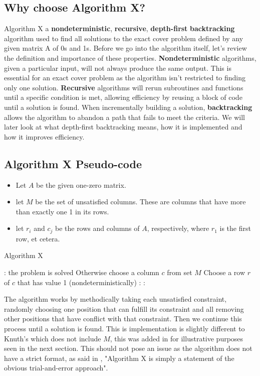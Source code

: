 \documentclass{article}
\begin{document}
\subsection{Why choose Algorithm X?}
Algorithm X a \textbf{nondeterministic}, \textbf{recursive}, \textbf{depth-first} \textbf{backtracking} algorithm used to find all solutions to the exact cover problem defined by any given matrix A of 0s and 1s. Before we go into the algorithm itself, let's review the definition and importance of these properties. \textbf{Nondeterministic} algorithms, given a particular input, will not always produce the same output. This is essential for an exact cover problem as the algorithm isn't restricted to finding only one solution. \textbf{Recursive} algorithms will rerun subroutines and functions until a specific condition is met, allowing efficiency by reusing a block of code until a solution is found. When incrementally building a solution, \textbf{backtracking} allows the algorithm to abandon a path that fails to meet the criteria. We will later look at what depth-first backtracking means, how it is implemented and how it improves efficiency.
\clearpage
\subsection{Algorithm X Pseudo-code}

\begin{itemize}
\item Let $A$ be the given one-zero matrix.
\item let $M$ be the set of unsatisfied columns. These are columns that have more than exactly one 1 in its rows.
\item let  $r_i$ and $c_j$ be the rows and columns of $A$, respectively, where $r_1$ is the first row, et cetera.
\end{itemize}

\begin{algorithm}
\caption{Algorithm X}\label{ax} 
\begin{algorithmic}[1]
: the problem is solved  \EndIf
\State Otherwise choose a  column $c$ from set $M$
\State Choose a row $r$ of $c$ that has value 1 (nondeterministically)
: 
: \EndFor
\EndFor
\end{algorithmic}
\end{algorithm}
The algorithm works by methodically taking each unsatisfied constraint, randomly choosing one position that can fulfill its constraint and all removing other positions that have conflict with that constraint. Then we continue this process until a solution is found. This is implementation is slightly different to Knuth's which does not include $M$, this was added in for illustrative purposes seen in the next section. This should not pose an issue as the algorithm does not have a strict format, as said in \cite{dlx}, "Algorithm X is simply a statement of the obvious trial-and-error approach".
\clearpage
\end{document}
